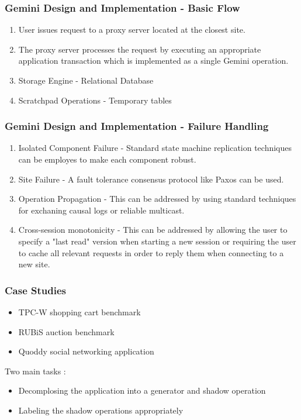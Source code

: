 \documentclass{beamer}
\begin{document}

\begin{frame}
\frametitle{Gemini Design and Implementation - Basic Flow}
\begin{enumerate}
\item User issues request to a proxy server located at the closest site.
\item The proxy server processes the request by executing an appropriate application transaction which is implemented as a single Gemini operation. 
\item Storage Engine - Relational Database
\item Scratchpad Operations - Temporary tables
\end{enumerate}
\end{frame}






\begin{frame}
\frametitle{Gemini Design and Implementation - Failure Handling}
\begin{enumerate}
\item Isolated Component Failure - Standard state machine replication techniques can be employes to make each component robust.
\item Site Failure - A fault tolerance consensus protocol like Paxos can be used.
\item Operation Propagation - This can be addressed by using standard techniques for exchaning causal logs or reliable multicast.
\item Cross-session monotonicity - This can be addressed by allowing the user to specify a "last read" version when starting a new session or requiring the user to cache all relevant requests in order to reply them when connecting to a new site.
\end{enumerate}
\end{frame}


\begin{frame}
\frametitle{Case Studies}
\begin{itemize}
\item TPC-W shopping cart benchmark
\item RUBiS auction benchmark
\item Quoddy social networking application
\end{itemize} 
Two main tasks :
\begin{itemize}
\item Decomplosing the application into a generator and shadow operation
\item Labeling the shadow operations appropriately
\end{itemize}
\end{frame}
\end{document}
